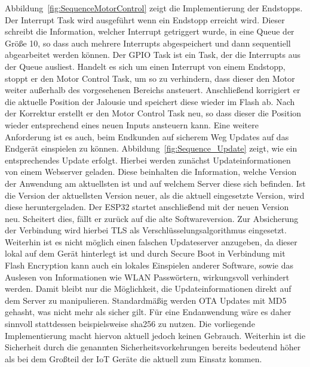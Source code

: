 Abbildung~\ref{fig:SequenceMotorControl} zeigt die Implementierung der Endstopps. Der Interrupt Task wird ausgeführt wenn ein Endstopp erreicht wird. Dieser schreibt die Information, welcher Interrupt getriggert wurde, in eine Queue der Größe 10, so dass auch mehrere Interrupts abgespeichert und dann sequentiell abgearbeitet werden können. Der GPIO Task ist ein Task, der die Interrupts aus der Queue ausliest. Handelt es sich um einen Interrupt von einem Endstopp, stoppt er den Motor Control Task, um so zu verhindern, dass dieser den Motor weiter außerhalb des vorgesehenen Bereichs ansteuert. Anschließend korrigiert er die aktuelle Position der Jalousie und speichert diese wieder im Flash ab. Nach der Korrektur erstellt er den Motor Control Task neu, so dass dieser die Position wieder entsprechend eines neuen Inputs ansteuern kann. Eine weitere Anforderung ist es auch, beim Endkunden auf sicherem Weg Updates auf das Endgerät einspielen zu können. Abbildung~\ref{fig:Sequence_Update} zeigt, wie ein entsprechendes Update erfolgt. Hierbei werden zunächst Updateinformationen von einem Webserver geladen. Diese beinhalten die Information, welche Version der Anwendung am aktuellsten ist und auf welchem Server diese sich befinden. Ist die Version der aktuellsten Version neuer, als die aktuell eingesetzte Version, wird diese heruntergeladen. Der ESP32 startet anschließend mit der neuen Version neu. Scheitert dies, fällt er zurück auf die alte Softwareversion. Zur Absicherung der Verbindung wird hierbei TLS als Verschlüsselungsalgorithmus eingesetzt. Weiterhin ist es nicht möglich einen falschen Updateserver anzugeben, da dieser lokal auf dem Gerät hinterlegt ist und durch Secure Boot in Verbindung mit Flash Encryption kann auch ein lokales Einspielen anderer Software, sowie das Auslesen von Informationen wie WLAN Passwörtern, wirkungsvoll verhindert werden. Damit bleibt nur die Möglichkeit, die Updateinformationen direkt auf dem Server zu manipulieren. Standardmäßig werden OTA Updates mit MD5 gehasht, was nicht mehr als sicher gilt. Für eine Endanwendung wäre es daher sinnvoll stattdessen beispielsweise sha256 zu nutzen. Die vorliegende Implementierung macht hiervon aktuell jedoch keinen Gebrauch. Weiterhin ist die Sicherheit durch die genannten Sicherheitsvorkehrungen bereits bedeutend höher als bei dem Großteil der IoT Geräte die aktuell zum Einsatz kommen.

